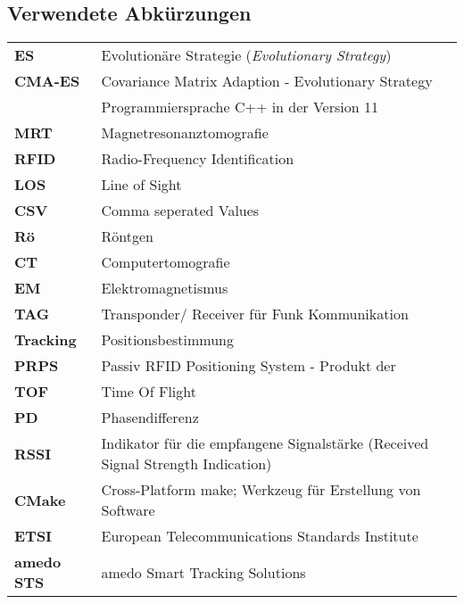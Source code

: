 \newpage
%
\subsection*{Verwendete Abkürzungen}
%
\begin{table} [H]
	\begin{center}
		\begin{tabular}{p{25mm}p{95mm}}
		      	\textbf{ES} & Evolutionäre Strategie (\textit{Evolutionary Strategy})\\
		      	\textbf{CMA-ES}  & Covariance Matrix Adaption - Evolutionary Strategy\\
		      	\textbf{\cpp11} & Programmiersprache C++ in der Version 11\\
		      	\textbf{MRT}	& Magnetresonanztomografie\\
		      	\textbf{RFID} & Radio-Frequency Identification\\
		      	\textbf{LOS} & Line of Sight\\
		      	\textbf{CSV} & Comma seperated Values\\
		      	\textbf{Rö} & Röntgen\\
		      	\textbf{CT} & Computertomografie\\
		      	\textbf{EM} & Elektromagnetismus\\
		      	\textbf{TAG} & Transponder/ Receiver für Funk Kommunikation\\
		      	\textbf{Tracking} & Positionsbestimmung\\
		      	\textbf{PRPS} & Passiv RFID Positioning System - Produkt der \amedogmbh \\
		      	\textbf{TOF} & Time Of Flight\\
		      	\textbf{PD} & Phasendifferenz\\
		      	\textbf{RSSI} & Indikator für die empfangene Signalstärke (Received Signal Strength Indication)\\
		      	\textbf{CMake} & Cross-Platform make; Werkzeug für Erstellung von Software\\
		      	\textbf{ETSI} & European Telecommunications Standards Institute\\
		      	\textbf{amedo STS} & amedo Smart Tracking Solutions\\
%		      	
		\end{tabular}
	\end{center}
\end{table}

